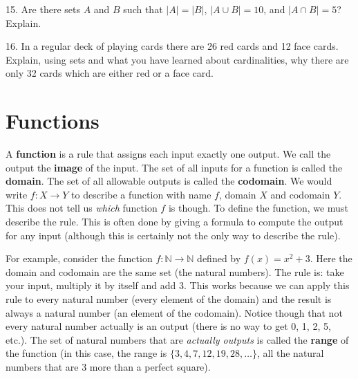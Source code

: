 \documentclass[10pt,]{book}
\newcommand{\terminology}[1]{\textbf{#1}}
\theoremstyle{plain}
\theoremstyle{definition}
\theoremstyle{definition}
\theoremstyle{definition}
\numberwithin{equation}{section}
\def\N{\mathbb N}
\begin{document}
\begin{exerciselist}
\par\smallskip
\item[15.]\hypertarget{exercise-25}{}
          Are there sets \(A\) and \(B\) such that \(|A| = |B|\), \(|A\cup B| = 10\), and \(|A\cap B| = 5\)? Explain.
\par\smallskip
\item[16.]\hypertarget{exercise-26}{}
          In a regular deck of playing cards there are 26 red cards and 12 face cards. Explain, using sets and what you have learned about cardinalities, why there are only 32 cards which are either red or a face card.
\par\smallskip
\end{exerciselist}
\typeout{************************************************}
\typeout{************************************************}
\section[Functions]{Functions}\label{sec_intro-functions}
\typeout{************************************************}
\typeout{************************************************}

      A
      \terminology{function} is a rule that assigns each input exactly one output.  We call the output the \terminology{image} of the input.  The set of all inputs for a function is called the
      \terminology{domain}. The set of all allowable outputs is called the
      \terminology{codomain}. We would write \(f:X \to Y\) to describe a function with name \(f\), domain \(X\) and codomain \(Y\). This does not tell us \emph{which} function \(f\) is though. To define the function, we must describe the rule. This is often done by giving a formula to compute the output for any input (although this is certainly not the only way to describe the rule). %
\par
 For example, consider the function \(f:\N \to \N\) defined by \(f(x) = x^2 + 3\). Here the domain and codomain are the same set (the natural numbers). The rule is: take your input, multiply it by itself and add 3. This works because we can apply this rule to every natural number (every element of the domain) and the result is always a natural number (an element of the codomain). Notice though that not every natural number actually is an output (there is no way to get 0, 1, 2, 5, etc.). The set of natural numbers that are \emph{actually outputs} is called the
      \terminology{range} of the function (in this case, the range is \(\{3, 4, 7, 12, 19, 28, \ldots\}\), all the natural numbers that are 3 more than a perfect square).
\par
\end{document}
